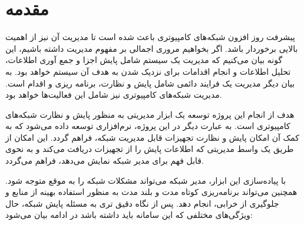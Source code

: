\chapter{مقدمه}

پیشرفت روز افزون شبکه‌های کامپیوتری باعث شده است تا مدیریت آن نیز از اهمیت بالایی برخوردار باشد. اگر بخواهیم مروری اجمالی بر مفهوم مدیریت داشته باشیم، این گونه بیان می‌کنیم که مدیریت یک سیستم شامل پایش اجزا و جمع آوری اطلاعات، تحلیل اطلاعات و انجام اقدامات برای نزدیک شدن به هدف آن سیستم خواهد بود. به بیان دیگر مدیریت یک فرایند دائمی شامل پایش و نظارت، برنامه ریزی و اقدام است. مدیریت شبکه‌های کامپیوتری نیز شامل این فعالیت‌ها خواهد بود.

هدف از انجام این پروژه توسعه یک ابزار مدیریتی به منظور پایش و نظارت شبکه‌های کامپیوتری است. به عبارت دیگر در این پروژه، نرم‌افزاری توسعه داده می‌شود که به کمک آن امکان پایش و نظارت تجهیزات قابل مدیریت شبکه، فراهم گردد. این امکان از طریق یک واسط مدیریتی که اطلاعات پایش را از تجهیزات دریافت می‌کند و به نحوی قابل فهم برای مدیر شبکه نمایش می‌دهد، فراهم می‌گردد\cite{mauro2005essential}.

با پیاده‌سازی این ابزار، مدیر شبکه می‌تواند مشکلات شبکه را به موقع متوجه شود. همچنین می‌تواند برنامه‌ریزی کوتاه مدت و بلند مدت به منظور استفاده بهینه از منابع و جلوگیری از خرابی، انجام دهد. پس از نگاه دقیق تری به مسئله پایش شبکه، حال ویژگی‌های مختلفی که این سامانه باید داشته باشد در ادامه بیان می‌شود:


